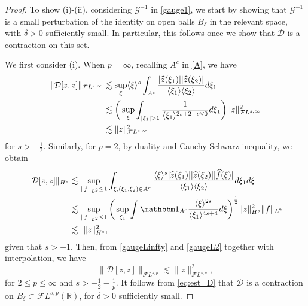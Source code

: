\documentclass[a4paper,
11pt,  reqno]{amsart}
\newcommand{\jap}[1]{\langle #1 \rangle}
\newcommand{\5}{\textup{V}}
\newcommand{\FL}{\mathcal{F} L}
\newcommand{\ind}{\mathbbm 1}
\newcommand{\les}{\lesssim}
\newcommand{\dl}{\delta}
\theoremstyle{remark}
\newcommand{\R}{\mathbb{R}}
\newcommand{\jb}[1]
{\langle #1 \rangle}
\newcommand{\Gc}{\mathcal{G}}
\numberwithin{equation}{section}
\numberwithin{theorem}{section}
\newcommand{\DD}{\mathcal{D}}
\begin{document}
\begin{proof}
To show (i)-(ii), considering $\Gc^{-1}$ in \eqref{gauge1}, we start by showing that $\Gc^{-1}$ is a small perturbation of the identity on open balls $B_\dl$ in the relevant space, with $\dl>0$ sufficiently small.
In particular, this follows once we show that $\DD$ is a contraction on this set. 


We first consider (i).
When $p=\infty$, recalling $A^c$ in \eqref{A}, we have
\begin{align}
\|\DD[z,z]\|_{\mathcal{F}L^{s,\infty}}   
&
\les
\sup_\xi \jb{\xi}^s \int_{A^c} 
\frac{|\widehat{z}(\xi_{1})||\widehat{z}(\xi_{2})|}{\jap{\xi_{1}}\jap{\xi_{2}}} d\xi_{1} 
\notag
\\
&\les
\bigg( \sup_{\xi} \int_{|\xi_{1}|>1} \frac{1}{\jap{\xi_{1}}^{2s+2 - s\lor 0 }} d\xi_{1} 
\bigg) 
\|z\|_{\mathcal{F}L^{s,\infty}}^2
\notag
\\
& \les
\|z\|_{ \mathcal{F}L^{s,\infty}}^2
\label{gaugeLinfty}
\end{align}
for $s>-\frac12$.
Similarly, for $p=2$, by duality and Cauchy-Schwarz inequality, we obtain
\begin{align}
\|\DD[z,z]\|_{H^s}   
&
\les 
\sup_{\|f\|_{L^2} \le 1 }
	 \int_{\xi, (\xi_1,\xi_2)\in A^c} \frac{\jap{\xi}^s|\widehat{z}(\xi_{1})||\widehat{z}(\xi_{2})||\widehat{f}(\xi)|}{\jap{\xi_{1}}\jap{\xi_{2}}} d\xi_{1}d\xi 
     \notag
    \\
    & \les \sup_{\|f\|_{L^2 } \le 1}  \bigg( \sup_{\xi_{1}}  \int \ind_{A^c} \frac{\jap{\xi}^{2s}}{\jap{\xi_{1}}^{4s+4}}d\xi \bigg)^{\frac{1}{2}}
\|z\|_{H^s}^2\|f\|_{L^2}
\notag
\\
&
\lesssim\  \|z\|_{H^s}^2, 
\label{gaugeL2}
\end{align}
given that $s>-1$. 
Then, from \eqref{gaugeLinfty} and \eqref{gaugeL2} together with interpolation, we have
\begin{equation}\label{eq:est_D}
		\|\DD[z,z]\|_{ \mathcal{F}L^{s,p}}
        \les
\|z\|_{ \mathcal{F}L^{s,p}}^2, 
\end{equation}
for $2 \le p \le \infty$ and $s> -\frac12 - \frac1p$.
It follows from \eqref{eq:est_D} that $\DD$ is a contraction on $B_\dl \subset \FL^{s,p}(\R)$, for $\dl>0$ sufficiently small.


\smallskip





\end{proof}
\end{document}
